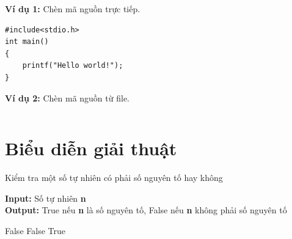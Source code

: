 \noindent\textbf{Ví dụ 1:} Chèn mã nguồn trực tiếp.
\begin{verbatim}
#include<stdio.h>
int main()
{
	printf("Hello world!");
}
\end{verbatim}


\newpage
\noindent\textbf{Ví dụ 2:} Chèn mã nguồn từ file.
\inputminted{c++}{code/XulyFileText.cpp}

\section{Biểu diễn giải thuật}

    \begin{algorithm}[H]
    \caption{Kiểm tra một số tự nhiên có phải số nguyên tố hay không}\label{prime_number_check}
    \hspace*{\algorithmicindent} \textbf{Input:} 
    Số tự nhiên \textbf{n}
    \\
    \hspace*{\algorithmicindent} \textbf{Output:} 
    True nếu \textbf{n} là số nguyên tố,
    False nếu \textbf{n} không phải số nguyên tố
    \begin{algorithmic}[1]
     \Return False
    \EndIf
     \Return False
    \EndIf
    \EndFor
    \State \Return True
    \EndFunction
    \end{algorithmic}
    \end{algorithm}




